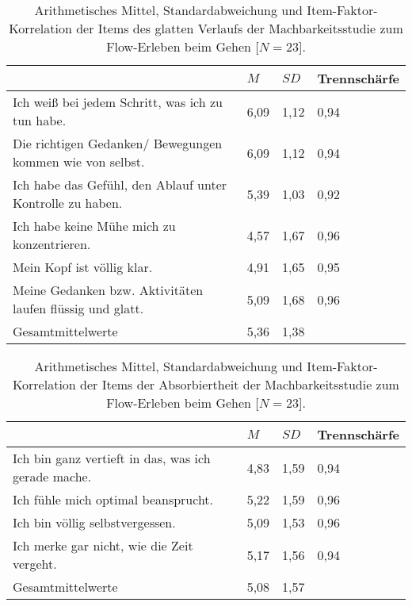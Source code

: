 \begin{table}
	[!htb] \centering \caption[Item-Faktor-Korrelation der Items des glatten Verlaufs (Machbarkeitsstudie: Gehen)]{Arithmetisches Mittel, Standardabweichung und Item-Faktor-Korrelation der Items des glatten Verlaufs der Machbarkeitsstudie zum Flow-Erleben beim Gehen [$N = 23$].} \label{tab:glatter_verlauf_2} 
	\begin{tabularx}
		{ 
		\textwidth}{p{} p{} p{} p{}} \toprule & $M$ & $SD$ & Trennschärfe \\
		\midrule Ich weiß bei jedem Schritt, was ich zu tun habe. & 6,09 & 1,12 & 0,94 \\
		Die richtigen Gedanken/ Bewegungen kommen wie von selbst. & 6,09 & 1,12 & 0,94 \\
		Ich habe das Gefühl, den Ablauf unter Kontrolle zu haben. & 5,39 & 1,03 & 0,92 \\
		Ich habe keine Mühe mich zu konzentrieren. & 4,57 & 1,67 & 0,96 \\
		Mein Kopf ist völlig klar. & 4,91 & 1,65 & 0,95 \\
		Meine Gedanken bzw. Aktivitäten laufen flüssig und glatt. & 5,09 & 1,68 & 0,96 \\
		Gesamtmittelwerte & 5,36 & 1,38 & \\
		\bottomrule 
	\end{tabularx}
\end{table}
\begin{table}
	[!htb] \centering \caption[Item-Faktor-Korrelation der Items der Absorbiertheit (Machbarkeitsstudie: Gehen)]{Arithmetisches Mittel, Standardabweichung und Item-Faktor-Korrelation der Items der Absorbiertheit der Machbarkeitsstudie zum Flow-Erleben beim Gehen [$N = 23$].} \label{tab:absorbiertheit_2} 
	\begin{tabularx}
		{ 
		\textwidth}{p{} p{} p{} p{}} \toprule & $M$ & $SD$ & Trennschärfe \\
		\midrule Ich bin ganz vertieft in das, was ich gerade mache. & 4,83 & 1,59 & 0,94 \\
		Ich fühle mich optimal beansprucht. & 5,22 & 1,59 & 0,96 \\
		Ich bin völlig selbstvergessen. & 5,09 & 1,53 & 0,96 \\
		Ich merke gar nicht, wie die Zeit vergeht. & 5,17 & 1,56 & 0,94 \\
		Gesamtmittelwerte & 5,08 & 1,57 & \\
		\bottomrule 
	\end{tabularx}
\end{table}

